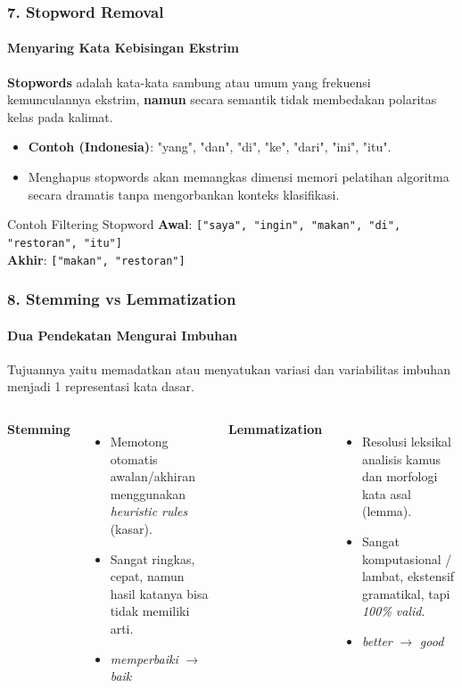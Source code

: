 \documentclass[t,aspectratio=169,xcolor=dvipsnames]{beamer}
\begin{document}
\begin{frame}
    \frametitle{7. Stopword Removal}
    \framesubtitle{Menyaring Kata Kebisingan Ekstrim}
    \small
    \textbf{Stopwords} adalah kata-kata sambung atau umum yang frekuensi kemunculannya ekstrim, \textbf{namun} secara semantik tidak membedakan polaritas kelas pada kalimat.
    
    \vspace{0.2cm}
    \begin{itemize}
        \item \textbf{Contoh (Indonesia)}: "yang", "dan", "di", "ke", "dari", "ini", "itu".
        \item Menghapus stopwords akan memangkas dimensi memori pelatihan algoritma secara dramatis tanpa mengorbankan konteks klasifikasi.
    \end{itemize}
    
    \vspace{0.2cm}
    \begin{alertblock}{Contoh Filtering Stopword}
        \textbf{Awal}: \texttt{["saya", "ingin", "makan", "di", "restoran", "itu"]} \\
        \textbf{Akhir}: \texttt{["makan", "restoran"]}
    \end{alertblock}
\end{frame}

\begin{frame}
    \frametitle{8. Stemming vs Lemmatization}
    \framesubtitle{Dua Pendekatan Mengurai Imbuhan}
    \small
    Tujuannya yaitu memadatkan atau menyatukan variasi dan variabilitas imbuhan menjadi 1 representasi kata dasar.
    \vspace{0.2cm}
    \begin{columns}[T]
        \textbf{Stemming}
        \begin{itemize}
            \item Memotong otomatis awalan/akhiran menggunakan \textit{heuristic rules} (kasar).
            \item Sangat ringkas, cepat, namun hasil katanya bisa tidak memiliki arti.
            \item \textit{memperbaiki} $\rightarrow$ \textit{baik}
        \end{itemize}
        
        \textbf{Lemmatization}
        \begin{itemize}
            \item Resolusi leksikal analisis kamus dan morfologi kata asal (lemma).
            \item Sangat komputasional / lambat, ekstensif gramatikal, tapi \textit{100\% valid}.
            \item \textit{better} $\rightarrow$ \textit{good}
        \end{itemize}
    \end{columns}
\end{frame}
\end{document}
